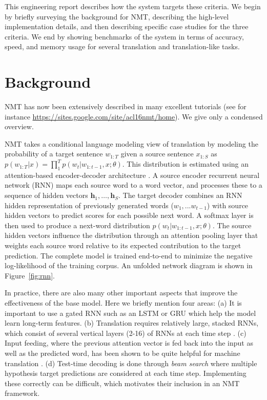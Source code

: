 \documentclass[]{article}
\begin{document}
This engineering report describes how the system targets these
criteria. We begin by briefly surveying the background for NMT,
describing the high-level implementation details, and then describing
specific case studies for the three criteria.  We end by showing
benchmarks of the system in terms of accuracy, speed, and memory usage
for several translation and translation-like tasks.



\section{Background}

NMT has now been extensively described in many
excellent tutorials (see for instance
\url{https://sites.google.com/site/acl16nmt/home}). We give only
a condensed overview. 

NMT takes a conditional language modeling view of translation by modeling the
probability of a target sentence $w_{1:T}$ given a source sentence
$x_{1:S}$ as
$p(w_{1:T}| x) = \prod_{1}^T p(w_t| w_{1:t-1}, x; \theta)$. This
distribution is estimated using an attention-based encoder-decoder
architecture \citep{Bahdanau2015}. A source encoder recurrent neural
network (RNN) maps each source word to a word vector, and processes
these to a sequence of hidden vectors
$\mathbf{h}_1, \ldots, \mathbf{h}_S$.  The target decoder combines an
RNN hidden representation of previously generated words
($w_1, ... w_{t-1}$) with source hidden vectors to predict scores for
each possible next word. A softmax layer is then used to produce a
next-word distribution $ p(w_t| w_{1:t-1}, x; \theta)$. The source
hidden vectors influence the distribution through an attention pooling
layer that weights each source word relative to its expected
contribution to the target prediction. The complete model is trained
end-to-end to minimize the negative log-likelihood of the training
corpus. An unfolded network diagram is shown in Figure~\ref{fig:rnn}.


In practice, there are also many other important aspects that improve
the effectiveness of the base model. Here we briefly mention four
areas: (a) It is important to use a gated RNN such as an LSTM
\citep{hochreiter1997long} or GRU \citep{chung2014empirical} which help
the model learn long-term features. (b) Translation requires
relatively large, stacked RNNs, which consist of several vertical
layers (2-16) of RNNs at each time step \citep{sutskever14sequence}. (c)
Input feeding, where the previous attention vector is fed back into
the input as well as the predicted word, has been shown to be quite
helpful for machine translation \citep{Luong2015}.  (d) Test-time
decoding is done through \textit{beam search} where multiple
hypothesis target predictions are considered at each time
step. Implementing these correctly can be difficult, which motivates
their inclusion in an NMT framework.
\end{document}
